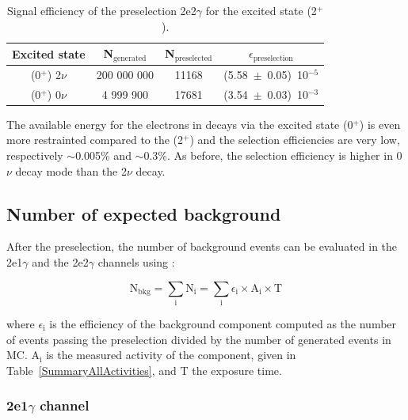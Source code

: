 \documentclass[main.tex]{subfiles}
\begin{document}
\begin{table}[h!]
\begin{center}
\begin{tabular}{c|c|c|c}
\toprule
Excited state & N$_\text{{generated}}$ & N$_\text{{preselected}}$ & $\epsilon_\text{{preselection}}$ \\[0.1cm]
\midrule
(0$^+$) 2$\nu$ & 200 000 000 & 11168 & (5.58~$\pm$~0.05)~10$^{-\text{5}}$\\[0.1cm]
(0$^+$) 0$\nu$ &   4 999 900 & 17681 & (3.54~$\pm$~0.03)~10$^{-\text{3}}$\\[0.1cm]
\bottomrule
\end{tabular}
\caption{Signal efficiency of the preselection 2e2$\gamma$ for the excited state (2$^+$).}
\label{EffPreselection0PLUS}
\end{center}
\end{table}


\NI The available energy for the electrons in decays via the excited state (0$^+$) is even more restrainted compared to the (2$^+$) and the selection efficiencies are very low, respectively $\sim$0.005\% and $\sim$0.3\%. As before, the selection efficiency is higher in 0$\nu$ decay mode than the 2$\nu$ decay.  


\subsection{Number of expected background}


\NI After the preselection, the number of background events can be evaluated in the 2e1$\gamma$ and the 2e2$\gamma$ channels using :


\begin{equation}
\text{N}_{\text{bkg}} = \sum_\text{i} \text{N}_\text{i} = \sum_\text{i} \epsilon_\text{i} \times \text{A}_\text{i} \times \text{T}
\end{equation}


\bigskip


\NI where $\epsilon_\text{i}$ is the efficiency of the background component computed as the number of events passing the preselection divided by the number of generated events in MC. A$_\text{i}$ is the measured activity of the component, given in Table~\ref{SummaryAllActivities}, and T the exposure time.


\subsubsection{2e1$\gamma$ channel}
\end{document}
